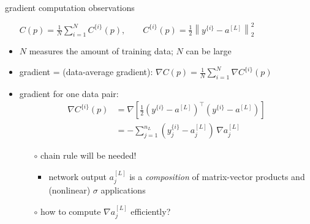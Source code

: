 \documentclass[xcolor={svgnames},
               hyperref={colorlinks,citecolor=DeepPink4,linkcolor=FireBrick,urlcolor=Maroon}]
               {beamer}
\newcommand{\grad}{\nabla}
\begin{document}
\begin{frame}{gradient computation observations}

\begin{itemize}
\item[] \qquad \small $\displaystyle C(p) = \frac{1}{N} \sum_{i=1}^N C^{\{i\}}(p), \qquad C^{\{i\}}(p) = \frac{1}{2} \left\|y^{\{i\}} - a^{[L]}\right\|_2^2$ \normalsize

\medskip
\item $N$ measures the amount of training data; $N$ can be large
\item gradient = (data-average gradient): \quad \small $\displaystyle \grad C(p) = \frac{1}{N} \sum_{i=1}^N \grad C^{\{i\}}(p)$ \normalsize
\item gradient for one data pair:
\begin{align*}
\grad C^{\{i\}}(p) &= \grad\left[\frac{1}{2} (y^{\{i\}} - a^{[L]})^\top (y^{\{i\}} - a^{[L]})\right] \\
    &= - \sum_{j=1}^{n_L} (y_j^{\{i\}} - a^{[L]}_j)\, \grad a^{[L]}_j
\end{align*}

    \begin{itemize}
    \item[$\circ$] chain rule will be needed!
        \begin{itemize}
        \item network output $a_j^{[L]}$ is a \emph{composition} of matrix-vector products and (nonlinear) $\sigma$ applications
        \end{itemize}
    \item[$\circ$] how to compute $\grad a^{[L]}_j$ efficiently?
    \end{itemize}
\end{itemize}
\end{frame}
\end{document}

